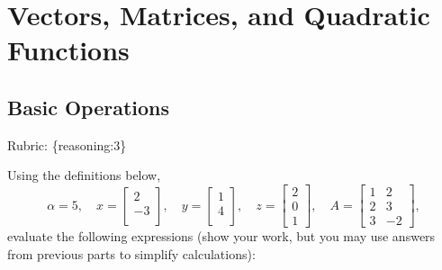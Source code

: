 \documentclass{article}
\def\rubric#1{\gre{Rubric: \{#1\}}}{}
\def\blu#1{{\color{blu}#1}}
\def\gre#1{{\color{gre}#1}}
\begin{document}
\section{Vectors, Matrices, and Quadratic Functions}

\subsection{Basic Operations}
\rubric{reasoning:3}

\noindent Using the definitions below,
\[
\alpha = 5,\quad
x = \left[\begin{array}{c}
2\\
-3\\
\end{array}\right], \quad
y = \left[\begin{array}{c}
1\\
4\\
\end{array}\right],\quad
z = \left[\begin{array}{c}
2\\
0\\
1\end{array}\right],
\quad
A = \left[\begin{array}{ccc}
1 & 2\\
2 & 3\\
3 & -2
\end{array}\right],
\]
\blu{evaluate the following expressions} (show your work, but you may use answers from previous parts to simplify calculations):\\
\end{document}
